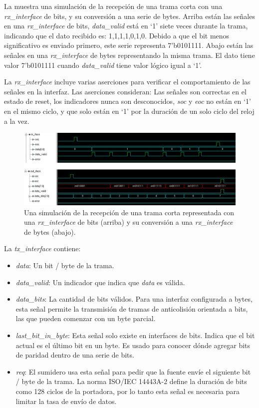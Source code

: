 \documentclass[a4paper, twoside, 11pt]{report}
\begin{document}
La  muestra una simulación de la recepción de una trama corta con una \textit{rx\_interface} de bits, y su conversión a una serie de bytes. Arriba están las señales en una \textit{rx\_interface} de bits, \textit{data\_valid} está en ‘1’ siete veces durante la trama, indicando que el dato recibido es: 1,1,1,1,0,1,0. Debido a que el bit menos significativo es enviado primero, este serie representa 7’b0101111. Abajo están las señales en una \textit{rx\_interface} de bytes representando la misma trama. El dato tiene valor 7’b0101111 cuando \textit{data\_valid} tiene valor lógico igual a ‘1’.

La \textit{rx\_interface} incluye varias aserciones para verificar el comportamiento de las señales en la interfaz. Las aserciones consideran: Las señales son correctas en el estado de reset, los indicadores nunca son desconocidos, \textit{soc} y \textit{eoc} no están en ‘1’ en el mismo ciclo, y que solo están en ‘1’ por la duración de un solo ciclo del reloj a la vez.

\begin{figure}[htb]
  \centering
  \includegraphics[width=1.0\textwidth]{./img/rx_iface_example}
  \caption{Una simulación de la recepción de una trama corta representada con una \textit{rx\_interface} de bits (arriba) y su conversión a una \textit{rx\_interface} de bytes (abajo).}
  \label{fig:rx_iface}
\end{figure}

\FloatBarrier

La \textit{tx\_interface} contiene:

\begin{itemize}
  \item \textit{data}: Un bit / byte de la trama.
  \item \textit{data\_valid}: Un indicador que indica que \textit{data} es válida.
  \item \textit{data\_bits}: La cantidad de bits válidos. Para una interfaz configurada a bytes, esta señal permite la transmisión de tramas de anticolisión orientada a bits, las que pueden comenzar con un byte parcial.
  \item \textit{last\_bit\_in\_byte}: Esta señal solo existe en interfaces de bits. Indica que el bit actual es el último bit en un byte. Es usado para conocer dónde agregar bits de paridad dentro de una serie de bits.
  \item \textit{req}: El sumidero usa esta señal para pedir que la fuente envíe el siguiente bit / byte de la trama. La norma ISO/IEC 14443A-2 define la duración de bits como 128 ciclos de la portadora, por lo tanto esta señal es necesaria para limitar la tasa de envío de datos.
\end{itemize}
\end{document}
